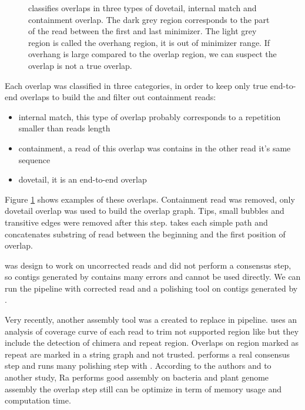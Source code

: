 \documentclass[main]{subfiles}
\begin{document}
\begin{figure}[ht]
    \centering
    
    \caption{\miniasm classifies overlaps in three types of dovetail, internal match and containment overlap. The dark grey region corresponds to the part of the read between the first and last minimizer. The light grey region is called the overhang region, it is out of minimizer range. If overhang is large compared to the overlap region, we can suspect the overlap is not a true overlap.}
    \label{sota:fig:miniasm:ovl_classification}
\end{figure}

Each overlap was classified in three categories, in order to keep only true end-to-end overlaps to build the \OLC and filter out containment reads:
\begin{itemize}
    \item internal match, this type of overlap probably corresponds to a repetition smaller than reads length
    \item containment, a read of this overlap was contains in the other read it's same sequence
    \item dovetail, it is an end-to-end overlap
\end{itemize}
Figure \ref{sota:fig:miniasm:ovl_classification} shows examples of these overlaps. Containment read was removed, only dovetail overlap was used to build the overlap graph. Tips, small bubbles and transitive edges were removed after this step. \miniasm takes each simple path and concatenates substring of read between the beginning and the first position of overlap.

\miniasm was design to work on uncorrected reads and did not perform a consensus step, so contigs generated by \miniasm contains many errors and cannot be used directly. We can run the \minimap \miniasm pipeline with corrected read and a polishing tool on contigs generated by \miniasm.

Very recently, another assembly tool \cite{Ra} was a created to replace \miniasm in \minimap \miniasm pipeline.  uses an analysis of coverage curve of each read to trim not supported region like \miniasm but they include the detection of chimera and repeat region. Overlaps on region marked as repeat are marked in a string graph and not trusted.  performs a real consensus step and runs many polishing step with . According to the authors and to another study\cite{long_read_assembler_comparison}, Ra performs good assembly on bacteria and plant genome assembly the overlap step still can be optimize in term of memory usage and computation time.
\end{document}
